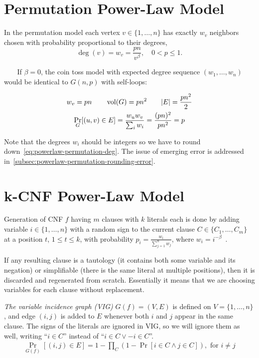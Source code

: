 \section{Permutation Power-Law Model}

In the permutation model each vertex $v\in\{1,\ldots,n\}$ has exactly
$w_v$ neighbors chosen with probability proportional to their degrees,
\begin{equation}
    \label{eq:powerlaw-permutation-deg}
    \deg(v)=w_v=\frac{pn}{v^\beta},\quad 0<p\leq 1.
\end{equation}

\begin{shaded}
$\quad\;\;$
If $\beta=0$, the coin toss model with expected degree sequence
$(w_1,\ldots,w_n)$ would be identical to $G(n,p)$ with self-loops:
\end{shaded}
\begin{gather*}
    w_v=pn
    \qquad \operatorname*{vol}(G)=pn^2
    \qquad|E|=\frac{p n^2}{2}\\
    \Pr_G[(u,v)\in E]=\frac{w_u w_v}{\sum_i w_i}=\frac{(pn)^2}{pn^2}=p
\end{gather*}

Note that the degrees $w_i$ should be integers so we have
to round down~\eqref{eq:powerlaw-permutation-deg}. The issue of emerging error
is addressed in~\autoref{subsec:powerlaw-permutation-rounding-error}.

\section{k-CNF Power-Law Model}
\label{sec:powerlaw-k-cnf-model}

Generation of CNF $f$ having $m$ clauses with $k$ literals each is done by adding variable $i\in\{1,\ldots,n\}$
with a random sign to the current clause $C\in\{C_1,\ldots,C_m\}$ at a position $t$, $1\leq t\leq k$, with probability
$p_i=\frac{w_i}{\sum_{j=1}^{n}{w_j}}$, where $w_i=i^{-\beta}$~\cite{abl09}.

If any resulting clause is a tautology (it contains both some variable and its negation) or simplifiable (there is the same literal at multiple positions),
then it is discarded and regenerated from scratch. Essentially it means that we are choosing variables for each clause without replacement.

\textit{The variable incidence graph (VIG)} $G(f)=(V,E)$ is defined on $V=\{1,\ldots,n\}$,
and edge $(i,j)$ is added to $E$ whenever both $i$ and $j$ appear in the same clause.
The signs of the literals are ignored in VIG, so we will ignore them as well,
writing ``$i\in C$'' instead of ``$i\in C\lor-i\in C$''.
\begin{gather}
    \Pr_{G(f)}[(i,j)\in E]=1-\prod_C{(1-\Pr[i\in C\land j\in C])},\text{ for }i\neq j
\end{gather}

